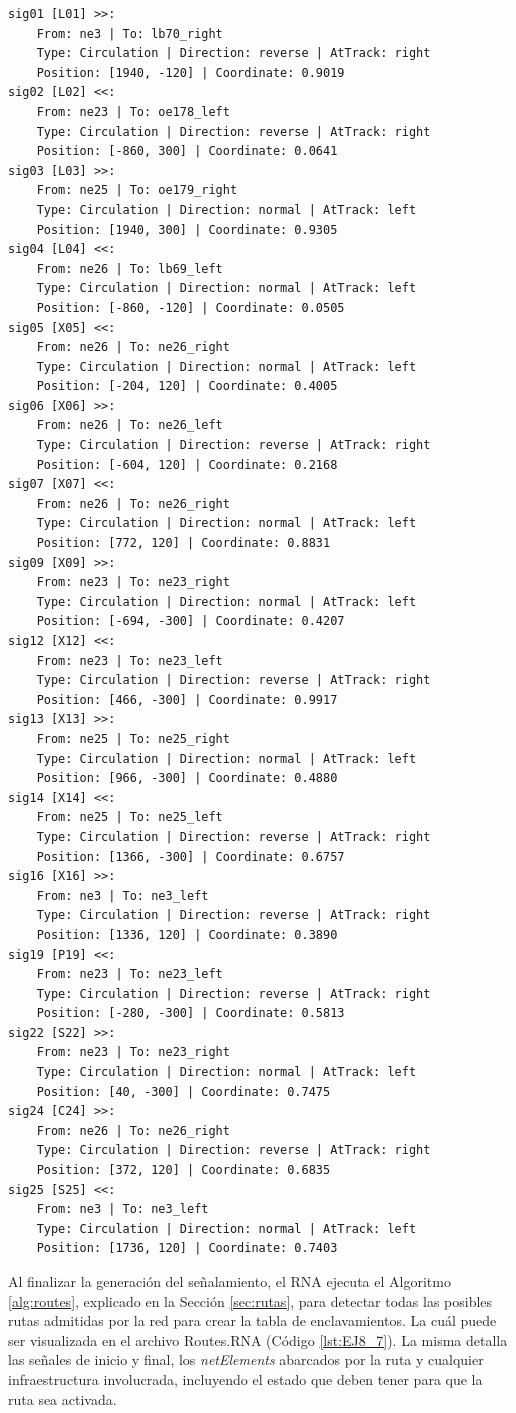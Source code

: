 	\begin{lstlisting}[language = {}, caption = Signalling.RNA, label = {lst:EJ8_6}]
sig01 [L01] >>:
	From: ne3 | To: lb70_right
	Type: Circulation | Direction: reverse | AtTrack: right 
	Position: [1940, -120] | Coordinate: 0.9019
sig02 [L02] <<:
	From: ne23 | To: oe178_left
	Type: Circulation | Direction: reverse | AtTrack: right 
	Position: [-860, 300] | Coordinate: 0.0641
sig03 [L03] >>:
	From: ne25 | To: oe179_right
	Type: Circulation | Direction: normal | AtTrack: left 
	Position: [1940, 300] | Coordinate: 0.9305
sig04 [L04] <<:
	From: ne26 | To: lb69_left
	Type: Circulation | Direction: normal | AtTrack: left 
	Position: [-860, -120] | Coordinate: 0.0505
sig05 [X05] <<:
	From: ne26 | To: ne26_right
	Type: Circulation | Direction: normal | AtTrack: left 
	Position: [-204, 120] | Coordinate: 0.4005
sig06 [X06] >>:
	From: ne26 | To: ne26_left
	Type: Circulation | Direction: reverse | AtTrack: right 
	Position: [-604, 120] | Coordinate: 0.2168
sig07 [X07] <<:
	From: ne26 | To: ne26_right
	Type: Circulation | Direction: normal | AtTrack: left 
	Position: [772, 120] | Coordinate: 0.8831
sig09 [X09] >>:
	From: ne23 | To: ne23_right
	Type: Circulation | Direction: normal | AtTrack: left 
	Position: [-694, -300] | Coordinate: 0.4207
sig12 [X12] <<:
	From: ne23 | To: ne23_left
	Type: Circulation | Direction: reverse | AtTrack: right 
	Position: [466, -300] | Coordinate: 0.9917
sig13 [X13] >>:
	From: ne25 | To: ne25_right
	Type: Circulation | Direction: normal | AtTrack: left 
	Position: [966, -300] | Coordinate: 0.4880
sig14 [X14] <<:
	From: ne25 | To: ne25_left
	Type: Circulation | Direction: reverse | AtTrack: right 
	Position: [1366, -300] | Coordinate: 0.6757
sig16 [X16] >>:
	From: ne3 | To: ne3_left
	Type: Circulation | Direction: reverse | AtTrack: right 
	Position: [1336, 120] | Coordinate: 0.3890
sig19 [P19] <<:
	From: ne23 | To: ne23_left
	Type: Circulation | Direction: reverse | AtTrack: right 
	Position: [-280, -300] | Coordinate: 0.5813
sig22 [S22] >>:
	From: ne23 | To: ne23_right
	Type: Circulation | Direction: normal | AtTrack: left 
	Position: [40, -300] | Coordinate: 0.7475
sig24 [C24] >>:
	From: ne26 | To: ne26_right
	Type: Circulation | Direction: reverse | AtTrack: right 
	Position: [372, 120] | Coordinate: 0.6835
sig25 [S25] <<:
	From: ne3 | To: ne3_left
	Type: Circulation | Direction: normal | AtTrack: left 
	Position: [1736, 120] | Coordinate: 0.7403
	\end{lstlisting}
	
	Al finalizar la generación del señalamiento, el RNA ejecuta el Algoritmo \ref{alg:routes}, explicado en la Sección \ref{sec:rutas}, para detectar todas las posibles rutas admitidas por la red para crear la tabla de enclavamientos. La cuál puede ser visualizada en el archivo Routes.RNA (Código \ref{lst:EJ8_7}). La misma detalla las señales de inicio y final, los \textit{netElements} abarcados por la ruta y cualquier infraestructura involucrada, incluyendo el estado que deben tener para que la ruta sea activada.
	
